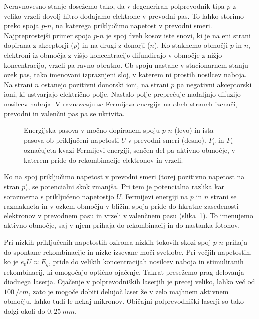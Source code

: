Neravnovesno stanje dosežemo tako, da v degeneriran polprevodnik tipa $p$ z 
veliko vrzeli dovolj hitro dodajamo elektrone v prevodni pas. To lahko storimo preko spoja
$p$-$n$, na katerega priključimo napetost v prevodni smeri. 
Najpreprostejši primer spoja $p$-$n$ je spoj dveh kosov iste snovi, ki je
na eni strani dopirana z akceptorji ($p$) in na drugi z donorji ($n$). 
Ko staknemo območji $p$ in $n$, elektroni iz območja z višjo koncentracijo 
difundirajo v območje z nižjo koncentracijo, vrzeli pa ravno obratno. 
Ob spoju nastane v stacionarnem stanju ozek pas, tako imenovani izpraznjeni sloj, 
v katerem ni prostih nosilcev naboja. Na strani $n$ ostanejo pozitivni donorski ioni, 
na strani $p$ pa negativni akceptorski ioni, ki ustvarjajo električno polje. 
Nastalo polje preprečuje nadaljnjo difuzijo nosilcev naboja. 
V ravnovesju se Fermijeva energija na obeh straneh izenači, 
prevodni in valenčni pas pa se ukrivita. 
\begin{figure}[h]
\centering
\def\svgwidth{140truemm} 

\caption{Energijska pasova v močno dopiranem spoju $p$-$n$ (levo) in 
ista pasova ob priključeni napetosti $U$ v prevodni smeri (desno). $F_p$ in $F_v$
označujeta kvazi-Fermijevi energiji, senčen del pa aktivno območje, 
v katerem pride do rekombinacije elektronov in vrzeli. 
}
\label{fig:pnlaser}
\end{figure}

Ko na spoj priključimo napetost v prevodni smeri (torej pozitivno napetost na stran
$p$), se potencialni skok zmanjša. Pri tem je potencialna razlika kar sorazmerna s priključeno
napetostjo $U$. Fermijevi energiji na $p$ in $n$ strani se razmakneta in v
ozkem območju v bližini spoja pride do hkratne zasedenosti elektronov
v prevodnem pasu in vrzeli v valenčnem pasu (slika~\ref{fig:pnlaser}). 
To imenujemo aktivno območje, saj v njem prihaja do rekombinacij in do nastanka fotonov. 

Pri nizkih 
priključenih napetostih oziroma nizkih tokovih skozi spoj $p$-$n$ prihaja
do spontane rekombinacije in nizke izsevane moči svetlobe. 
Pri večjih napetostih, ko je $e_0U \approx E_g$, pride do velikih koncentracijah nosilcev naboja in
stimuliranih rekombinacij, ki omogočajo optično ojačenje. Takrat presežemo prag delovanja
diodnega laserja. 
Ojačenje v polprevodniških laserjih je precej veliko, lahko več od 
$100~/\si{cm}$, zato je mogoče dobiti delujoč laser že v zelo majhnem aktivnem 
območju, lahko tudi le nekaj mikronov. Običajni polprevodniški laserji so tako 
dolgi okoli do $0,25~\si{mm}$.

